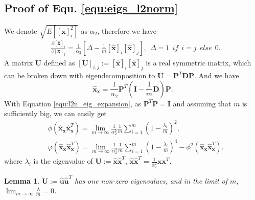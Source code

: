 \documentclass[10pt,journal,compsoc]{IEEEtran}
\newtheorem{lemma}[theorem]{Lemma}
\begin{document}
\subsection{Proof of Equ. \ref{equ:eigs_l2norm}}\label{proof:eigs_l2norm}
We denote $\sqrt{E\left[[\mathbf{x}]_i^2\right]}$ as $\alpha_2$, therefore we have
\begin{equation}
    \begin{split}
        & \frac{\partial [\hat{\mathbf{x}}]_i}{\partial [\mathbf{x}]_j} = \frac{1}{\alpha_2}\left[\Delta - \frac{1}{m}[\hat{\mathbf{x}}]_i[\hat{\mathbf{x}}]_j\right],~~\Delta=1~~if~~i=j~~else~~0.
    \end{split}
\end{equation}
A matrix $\mathbf{U}$ defined as $[\mathbf{U}]_{i,j}:=[\hat{\mathbf{x}}]_i[\hat{\mathbf{x}}]_j$ is a real symmetric matrix, which can be broken down with eigendecomposition to $\mathbf{U}=\mathbf{P}^T\mathbf{DP}$. And we have
\begin{equation}
    \hat{\mathbf{x}}_{\mathbf{x}}=\frac{1}{\alpha_2}\mathbf{P}^T(\mathbf{I}-\frac{1}{m}\mathbf{D})\mathbf{P}.
    \label{equ:l2n_eig_expansion}
\end{equation}
With Equation \eqref{equ:l2n_eig_expansion}, as $\mathbf{P}^T\mathbf{P}=\mathbf{I}$ and assuming that $m$ is sufficiently big, we can easily get
\begin{equation}
\begin{split}
    &\phi(\hat{\mathbf{x}}_{\mathbf{x}}\hat{\mathbf{x}}_{\mathbf{x}}^T) = \lim_{m\rightarrow\infty} \frac{1}{\alpha_2^2}\frac{1}{m}\sum_{i=1}^m(1-\frac{\lambda_i}{m})^2,\\
    &\varphi(\hat{\mathbf{x}}_{\mathbf{x}}\hat{\mathbf{x}}_{\mathbf{x}}^T) = \lim_{m\rightarrow\infty} \frac{1}{\alpha_2^4}\frac{1}{m}\sum_{i=1}^m(1-\frac{\lambda_i}{m})^4 - \phi^2(\hat{\mathbf{x}}_{\mathbf{x}}\hat{\mathbf{x}}_{\mathbf{x}}^T).
\end{split}
\label{equ:eig_l2n_pre}
\end{equation}
where $\lambda_i$ is the eigenvalue of $\mathbf{U}:= \hat{\mathbf{x}}\hat{\mathbf{x}}^T$, $\hat{\mathbf{x}}\hat{\mathbf{x}}^T = \frac{1}{\alpha_2^2}\mathbf{x}\mathbf{x}^T$.
\begin{lemma}
 $\mathbf{U}:= \hat{\mathbf{u}}\hat{\mathbf{u}}^T$ has one non-zero eigenvalues, and in the limit of $m$, $\lim_{m\rightarrow\infty}\frac{\lambda}{m}=0$.
 \label{lemma:eig_l2n}
\end{lemma}
\end{document}
